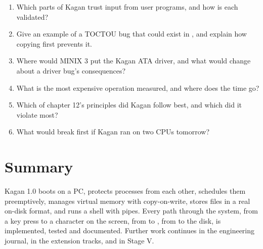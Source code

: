 \documentclass[11pt,a4paper]{article}
\begin{document}
\begin{questionbox}
\begin{enumerate}
  \item Which parts of Kagan trust input from user programs, and how is each validated?
  \item Give an example of a TOCTOU bug that could exist in , and explain how copying first prevents it.
  \item Where would MINIX 3 put the Kagan ATA driver, and what would change about a driver bug's consequences?
  \item What is the most expensive operation measured, and where does the time go?
  \item Which of \MOS chapter 12's principles did Kagan follow best, and which did it violate most?
  \item What would break first if Kagan ran on two CPUs tomorrow?
\end{enumerate}
\end{questionbox}

\section{Summary}

Kagan 1.0 boots on a PC, protects processes from each other,
schedules them preemptively, manages virtual memory with copy-on-write, stores files in a real on-disk format, and runs
a shell with pipes. Every path through the system, from a key press to a character on the screen, from 
to , from  to the disk, is implemented, tested and documented. Further work continues in the
engineering journal, in the extension tracks, and in Stage V.

\booklegend
\end{document}
